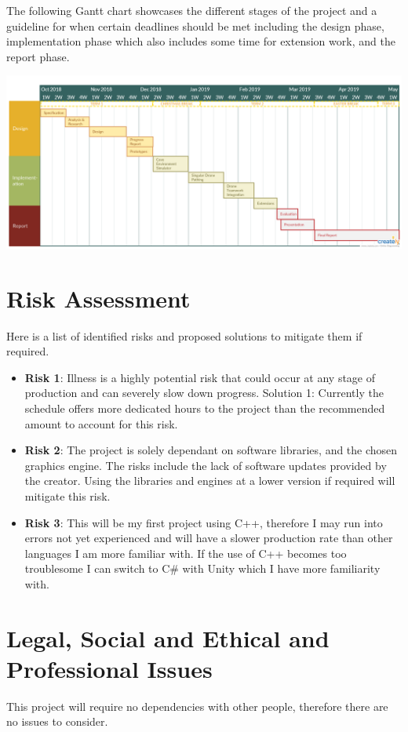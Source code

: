 \documentclass[12pt]{article}
\begin{document}
\pagebreak[4]

The following Gantt chart showcases the different stages of the project and a guideline for when certain deadlines should be met including the design phase, implementation phase which also includes some time for extension work, and the report phase.

\includegraphics[scale=0.22]{timetable.png}

\section{Risk Assessment}
Here is a list of identified risks and proposed solutions to mitigate them if required.

\begin{itemize}
    \item \textbf{Risk 1}: Illness is a highly potential risk that could occur at any stage of production and can severely slow down progress. Solution 1: Currently the schedule offers more dedicated hours to the project than the recommended amount to account for this risk.
    \item \textbf{Risk 2}: The project is solely dependant on software libraries, and the chosen graphics engine. The risks include the lack of software updates provided by the creator. Using the libraries and engines at a lower version if required will mitigate this risk.
    \item \textbf{Risk 3}: This will be my first project using C++, therefore I may run into errors not yet experienced and will have a slower production rate than other languages I am more familiar with. If the use of C++ becomes too troublesome I can switch to C\# with Unity which I have more familiarity with.
\end{itemize}

\section{Legal, Social and Ethical and Professional Issues}
This project will require no dependencies with other people, therefore there are no issues to consider.
\end{document}
